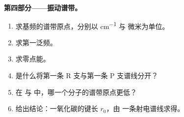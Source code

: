 \begin{problem}
\medskip\noindent\textbf{第四部分——振动谱带。}
\begin{enumerate}[resume]
  \item 求基频的谱带原点，分别以 \unit{cm^{-1}} 与
        微米为单位。
  \item 求第一泛频。
  \item 求零点能。
  \item 是什么将第一条 R 支与第一条 P 支谱线分开？
  \item 在  与  中，哪一个分子的谱带原点更低？
  \item 给出结论：一氧化碳的键长 $r_0$，由
        一条射电谱线求得。
\end{enumerate}
\end{problem}
